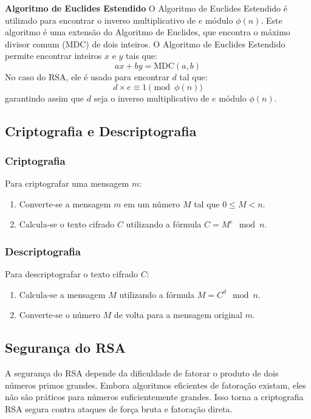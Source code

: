\documentclass[a4paper,12pt]{article}
\begin{document}
\textbf{Algoritmo de Euclides Estendido}
O Algoritmo de Euclides Estendido é utilizado para encontrar o inverso multiplicativo de \( e \) módulo \( \phi(n) \). Este algoritmo é uma extensão do Algoritmo de Euclides, que encontra o máximo divisor comum (MDC) de dois inteiros. O Algoritmo de Euclides Estendido permite encontrar inteiros \( x \) e \( y \) tais que:
\[ ax + by = \text{MDC}(a, b) \]
No caso do RSA, ele é usado para encontrar \( d \) tal que:
\[ d \times e \equiv 1 \pmod{\phi(n)} \]
garantindo assim que \( d \) seja o inverso multiplicativo de \( e \) módulo \( \phi(n) \).

\subsection*{Criptografia e Descriptografia}

\subsubsection*{Criptografia}
Para criptografar uma mensagem \( m \):
\begin{enumerate}
    \item Converte-se a mensagem \( m \) em um número \( M \) tal que \( 0 \leq M < n \).
    \item Calcula-se o texto cifrado \( C \) utilizando a fórmula \( C = M^e \mod n \).
\end{enumerate}

\subsubsection*{Descriptografia}
Para descriptografar o texto cifrado \( C \):
\begin{enumerate}
    \item Calcula-se a mensagem \( M \) utilizando a fórmula \( M = C^d \mod n \).
    \item Converte-se o número \( M \) de volta para a mensagem original \( m \).
\end{enumerate}

\subsection*{Segurança do RSA}
A segurança do RSA depende da dificuldade de fatorar o produto de dois números primos grandes. Embora algoritmos eficientes de fatoração existam, eles não são práticos para números suficientemente grandes. Isso torna a criptografia RSA segura contra ataques de força bruta e fatoração direta.
\end{document}
